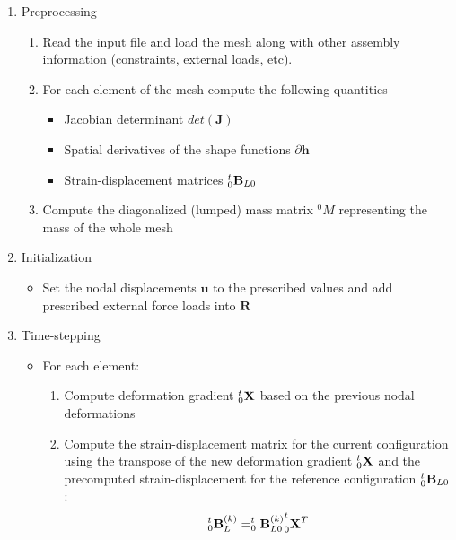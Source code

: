 \begin{enumerate}

  \item Preprocessing

  \begin{enumerate}

    \item Read the input file and load the mesh along with other assembly information (constraints, external loads, etc).
    \item For each element of the mesh compute the following quantities

    \begin{itemize}

      \item Jacobian determinant $det(\textbf{J})$
      \item Spatial derivatives of the shape functions $\partial{\textbf{h}}$
      \item Strain-displacement matrices $_{0}^{t}\textrm{\textbf{B}}_{L0}$
    \end{itemize}

    \item Compute the diagonalized (lumped) mass matrix $^{0}M$ representing the mass of the whole mesh

  \end{enumerate}

  \item Initialization \label{fea-algorithm-initialization}
  \begin{itemize}
    \item Set the nodal displacements $\textbf{u}$ to the prescribed values and add prescribed external force loads into $\textbf{R}$
  \end{itemize}

  \item Time-stepping
  \begin{itemize}
    \item For each element:
    \begin{enumerate}
      \item Compute deformation gradient $_{0}^{t}\textrm{\textbf{X}}$ based on the previous nodal deformations
      \item Compute the strain-displacement matrix for the current configuration using the transpose of  the new deformation gradient $_{0}^{t}\textrm{\textbf{X}}$ and the precomputed strain-displacement for the reference configuration $_{0}^{t}\textrm{\textbf{B}}_{L0}$:
        \begin{equation}
        \label{eq-stress-strain}
        _{0}^{t}\textrm{\textbf{B}}_{L}^{(k)} = _{0}^{t}{\textrm{\textbf{B}}_{L0}^{(k)}}
        _{0}^{t}\textrm{\textbf{X}}^{T}
        \end{equation}



\end{enumerate}
\end{itemize}
\end{enumerate}
